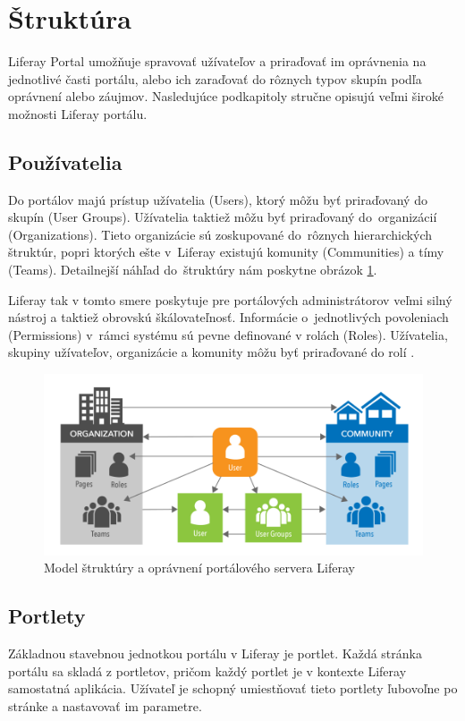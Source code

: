 \documentclass[
  digital, %
  twoside, %
  notable,   %
  nolof,   %
  nolot,   %
]{fithesis3}
\begin{document}
\section{Štruktúra}
Liferay Portal umožňuje spravovať užívateľov a priraďovať im oprávnenia na jednotlivé časti portálu, alebo ich zaraďovať do rôznych typov skupín podľa oprávnení alebo záujmov. Nasledujúce podkapitoly stručne opisujú veľmi široké možnosti Liferay portálu.

\subsection{Používatelia}
\label{liferay_users}
Do portálov majú prístup užívatelia (Users), ktorý môžu byť priraďovaný do skupín (User Groups). Užívatelia taktiež môžu byť priraďovaný do~organizácií (Organizations). Tieto organizácie sú zoskupované do~rôznych hierarchických štruktúr, popri ktorých ešte v~Liferay existujú komunity (Communities) a tímy (Teams). Detailnejší náhľad do~štruktúry nám poskytne obrázok \ref{liferay_structure}.

Liferay tak v tomto smere poskytuje pre portálových administrátorov veľmi silný nástroj a taktiež obrovskú škálovateľnosť. Informácie o~jednotlivých povoleniach (Permissions) v~rámci systému sú pevne definované v rolách (Roles). Užívatelia, skupiny užívateľov, organizácie a komunity môžu byť priraďované do rolí \cite{sezov2010portal}.

\begin{figure}[H]
	\center
	\includegraphics[width=1.0\linewidth]{liferay_structure}
	\caption{Model štruktúry a oprávnení portálového servera Liferay \cite{sezov2010portal}}
	\label{liferay_structure}
\end{figure}

\subsection{Portlety}
\label{portlets}
Základnou stavebnou jednotkou portálu v Liferay je portlet. Každá stránka portálu sa skladá z portletov, pričom každý portlet je v kontexte Liferay samostatná aplikácia. Užívateľ je schopný umiestňovať tieto portlety ľubovoľne po stránke a nastavovať im parametre.
\end{document}
